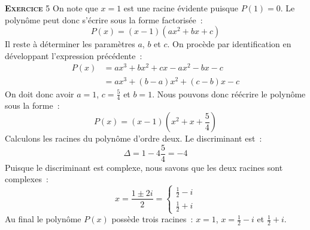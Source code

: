 \documentclass[10pt,a4paper,notitlepage]{article}
\newcommand{\exercice}[1]{\textsc{\textbf{Exercice}} #1}
\begin{document}
\exercice{5} On note que $x=1$ est une racine évidente puisque $P(1)=0$. Le polynôme peut donc s'écrire sous la forme factorisée :
\[
P(x) = (x-1)(ax^2+bx+c)
\]
Il reste à déterminer les paramètres $a$, $b$ et $c$. On procède par identification en développant l'expression précédente :
\[
  \begin{split}
    P(x) &= ax^3+bx^2+cx-ax^2-bx-c\\
    &= ax^3 +(b-a)x^2+(c-b)x-c
  \end{split}
\]
On doit donc avoir $a=1$, $c=\frac{5}{4}$ et $b=1$. Nous pouvons donc réécrire le polynôme sous la forme :
\[
P(x) = (x-1)(x^2+x+\frac{5}{4})
\]
Calculons les racines du polynôme d'ordre deux. Le discriminant est :
\[
\Delta = 1-4\frac{5}{4}=-4
\]
Puisque le discriminant est complexe, nous savons que les deux racines sont complexes :
\[
  x = \frac{1\pm 2i}{2} =
  \begin{cases}
    \frac{1}{2}-i\\
    \frac{1}{2}+i
  \end{cases}
\]
Au final le polynôme $P(x)$ possède trois racines : $x=1$, $x=\frac{1}{2}-i$ et $\frac{1}{2}+i$.

\bigskip
\end{document}
